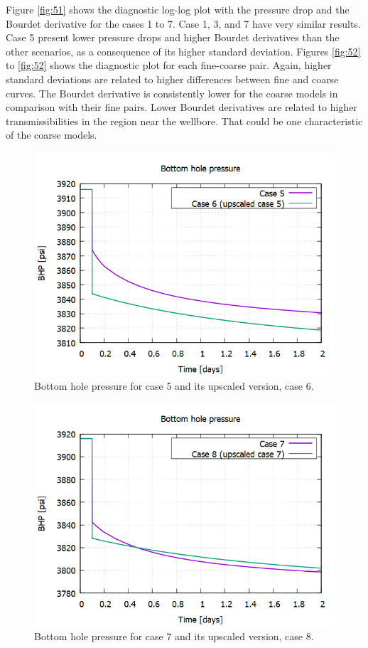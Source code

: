 Figure \ref{fig:51} shows the diagnostic log-log plot with the pressure drop and the Bourdet derivative for the cases 1 to 7. Case 1, 3, and 7 have very similar results. Case 5 present lower pressure drops and higher Bourdet derivatives than the other scenarios, as a consequence of its higher standard deviation. Figures \ref{fig:52} to \ref{fig:52} shows the diagnostic plot for each fine-coarse pair. Again, higher standard deviations are related to higher differences between fine and coarse curves. The Bourdet derivative is consistently lower for the coarse models in comparison with their fine pairs. Lower Bourdet derivatives are related to higher transmissibilities in the region near the wellbore. That could be one characteristic of the coarse models. 

\begin{figure}[H]
	\centering
	\includegraphics[width=0.8\linewidth]{Images/49}
	\caption{Bottom hole pressure for case 5 and its upscaled version, case 6.}
	\label{fig:49}
\end{figure}

\begin{figure}[H]
	\centering
	\includegraphics[width=0.8\linewidth]{Images/50}
	\caption{Bottom hole pressure for case 7 and its upscaled version, case 8.}
	\label{fig:50}
\end{figure}

